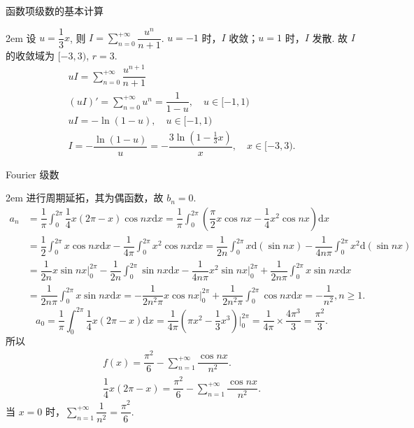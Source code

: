 \documentclass[UTF8,14pt,normal]{ctexart}
\begin{document}
 函数项级数的基本计算

    \hangindent 2em
    \noindent
    设 \(u = \dfrac{1}{3} x\), 则 \(I = \sum_{n = 0}^{+\infty} \dfrac{u^{n}}{n + 1}\). \(u = -1\) 时，\(I\) 收敛；\(u = 1\) 时，\(I\) 发散. 故 \(I\) 的收敛域为 \([-3, 3)\), \(r = 3\). \\
    \begin{gather*}
        uI = \sum_{n = 0}^{+\infty} \dfrac{u^{n + 1}}{n + 1} \\
        (uI)' = \sum_{n = 0}^{+\infty} u^{n} = \dfrac{1}{1 - u}, \quad u \in [-1, 1) \\
        uI = -\ln (1 - u), \quad u \in [-1, 1) \\
        I = -\dfrac{\ln (1 - u)}{u} = -\dfrac{3\ln (1 - \frac{1}{3} x)}{x}, \quad x \in [-3, 3).
    \end{gather*}

 Fourier 级数

    \hangindent 2em
    \noindent
    进行周期延拓，其为偶函数，故 \(b_n = 0\).
    \begin{align*}
        a_n & = \dfrac{1}{\pi} \int_{0}^{2\pi} \dfrac{1}{4} x(2\pi - x)\cos nx \mathrm{d} x = \dfrac{1}{\pi} \int_{0}^{2\pi} (\dfrac{\pi}{2} x \cos nx - \dfrac{1}{4} x^2 \cos nx) \mathrm{d} x \\ & = \dfrac{1}{2} \int_{0}^{2\pi} x \cos nx \mathrm{d} x - \dfrac{1}{4\pi} \int_{0}^{2\pi} x^2 \cos nx \mathrm{d} x = \dfrac{1}{2n} \int_0^{2\pi} x \mathrm{d}(\sin nx) - \dfrac{1}{4n\pi} \int_0^{2\pi} x^2 \mathrm{d} (\sin nx) \\ & = \dfrac{1}{2n} x \sin nx \bigg|_0^{2\pi} - \dfrac{1}{2n} \int_0^{2\pi} \sin nx \mathrm{d} x - \dfrac{1}{4n\pi} x^2 \sin nx \bigg|_0^{2\pi} + \dfrac{1}{2n\pi} \int_0^{2\pi} x \sin nx \mathrm{d} x \\ & = \dfrac{1}{2n\pi} \int_0^{2\pi} x \sin nx \mathrm{d} x = -\dfrac{1}{2n^2\pi} x \cos nx \bigg|_0^{2\pi} + \dfrac{1}{2n^2\pi} \int_0^{2\pi} \cos nx \mathrm{d} x = -\dfrac{1}{n^2}, n \geqslant 1. 
    \end{align*}
    \[
        a_0 = \dfrac{1}{\pi} \int_{0}^{2\pi} \dfrac{1}{4} x(2\pi - x) \mathrm{d} x = \dfrac{1}{4\pi} (\pi x^2 - \dfrac{1}{3} x^3) \bigg|_{0}^{2\pi} = \dfrac{1}{4\pi} \times \dfrac{4\pi^3}{3} = \dfrac{\pi^2}{3}.
    \]
    所以
    \begin{gather*}
        f(x) = \dfrac{\pi^2}{6} - \sum_{n = 1}^{+\infty} \dfrac{\cos nx}{n^2}. \\
        \dfrac{1}{4} x(2\pi - x) = \dfrac{\pi^2}{6} - \sum_{n = 1}^{+\infty} \dfrac{\cos nx}{n^2}.
    \end{gather*}
    当 \(x = 0\) 时，\(\sum_{n = 1}^{+\infty} \dfrac{1}{n^2} = \dfrac{\pi^2}{6}\).
\end{document}
